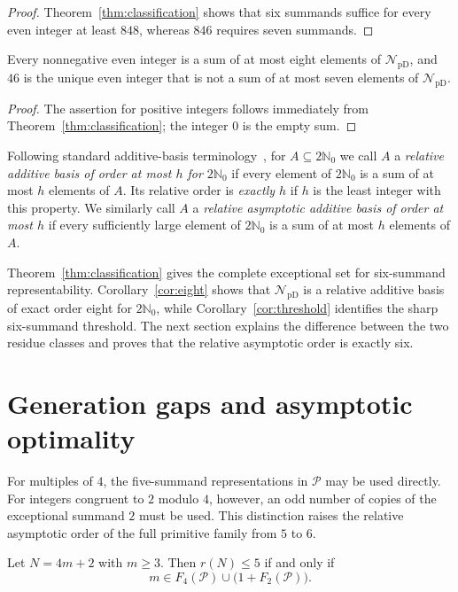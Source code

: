 \documentclass{ws-ijfcs}
\newcommand{\NpD}{\mathcal{N}_{\mathrm{pD}}}
\newcommand{\Pset}{\mathcal P}
\begin{document}
\begin{proof}
Theorem~\ref{thm:classification} shows that six summands suffice for every
even integer at least $848$, whereas $846$ requires seven summands.
\end{proof}

\begin{corollary}\label{cor:eight}
Every nonnegative even integer is a sum of at most eight elements of
$\NpD$, and $46$ is the unique even integer that is not a sum of at most
seven elements of $\NpD$.
\end{corollary}

\begin{proof}
The assertion for positive integers follows immediately from
Theorem~\ref{thm:classification}; the integer $0$ is the empty sum.
\end{proof}

Following standard additive-basis terminology~\cite{Nathanson}, for
$A\subseteq2\mathbb N_0$ we call $A$ a \emph{relative additive basis of
order at most $h$ for $2\mathbb N_0$} if every element of $2\mathbb N_0$ is a
sum of at most $h$ elements of $A$.  Its relative order is \emph{exactly $h$}
if $h$ is the least integer with this property.  We similarly call $A$ a
\emph{relative asymptotic additive basis of order at most $h$} if every
sufficiently large element of $2\mathbb N_0$ is a sum of at most $h$ elements
of $A$.

Theorem~\ref{thm:classification} gives the complete exceptional set for
six-summand representability.  Corollary~\ref{cor:eight} shows that $\NpD$ is
a relative additive basis of exact order eight for $2\mathbb N_0$, while
Corollary~\ref{cor:threshold} identifies the sharp six-summand threshold.
The next section explains the difference between the two residue classes and
proves that the relative asymptotic order is exactly six.
\section{Generation gaps and asymptotic optimality}\label{sec:asymptotic}

For multiples of $4$, the five-summand representations in $\Pset$ may be
used directly.  For integers congruent to $2$ modulo $4$, however, an odd
number of copies of the exceptional summand $2$ must be used.  This
distinction raises the relative asymptotic order of the full primitive
family from $5$ to $6$.

\begin{corollary}\label{cor:fivecrit}
Let $N=4m+2$ with $m\geq3$.  Then $r(N)\leq5$ if and only if
\begin{equation}\label{eq:fivecrit}
 m\in F_4(\Pset)\cup\bigl(1+F_2(\Pset)\bigr).
\end{equation}
\end{corollary}
\end{document}
